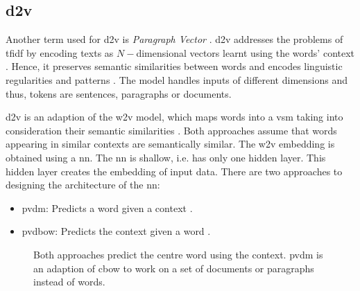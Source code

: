 \subsection{\ac{d2v}}\label{subsec:doc2vec}

Another term used for \ac{d2v} is \textit{Paragraph Vector} \cite{clusteringDocs2020, SentRep2014}.
\ac{d2v} addresses the problems of \ac{tfidf} by encoding texts as $N-$dimensional vectors learnt using the words' context \cite{clusteringDocs2020}.
Hence, it preserves semantic similarities between words and encodes linguistic regularities and patterns \cite{SkipGram2013}.
The model handles inputs of different dimensions and thus, tokens are sentences, paragraphs or documents.

\ac{d2v} is an adaption of the \ac{w2v} model, which maps words into a \ac{vsm} taking into consideration their semantic similarities \cite{clusteringDocs2020}.
Both approaches assume that words appearing in similar contexts are semantically similar. %
The \ac{w2v} embedding is obtained using a \ac{nn}. %
The \ac{nn} is shallow, i.e. has only one hidden layer.
This hidden layer creates the embedding of input data.
There are two approaches to designing the architecture of the \ac{nn}:
\begin{itemize}
    \item \ac{pvdm}: 
        Predicts a word given a context \cite{SentRep2014, WordRep2013}.
    \item \ac{pvdbow}: 
        Predicts the context given a word \cite{EmbDist2015, SkipGram2013, SentRep2014}.
\end{itemize}


\begin{figure}%
    \centering
    \qquad
    \caption{Both approaches predict the centre word using the context.
    \ac{pvdm} is an adaption of \ac{cbow} to work on a set of documents or paragraphs instead of words.
    }%
    \label{fig:pvdm}%
\end{figure}
 
